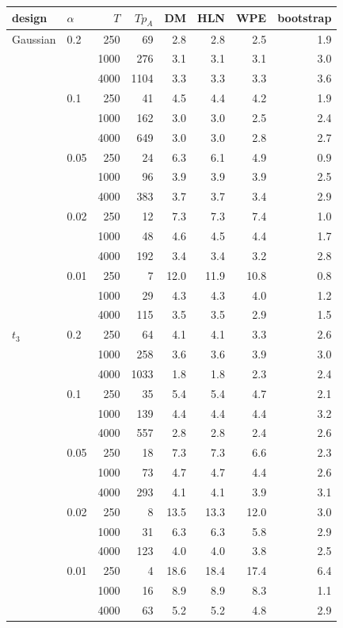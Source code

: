 \begin{tabular}{llrrrrrr}
\toprule
design & $\alpha$ & $T$ & $Tp_A$ & DM & HLN & WPE & bootstrap\\
\midrule
Gaussian & 0.2 & 250 & 69 & 2.8 & 2.8 & 2.5 & 1.9\\
 &  & 1000 & 276 & 3.1 & 3.1 & 3.1 & 3.0\\
 &  & 4000 & 1104 & 3.3 & 3.3 & 3.3 & 3.6\\
 & 0.1 & 250 & 41 & 4.5 & 4.4 & 4.2 & 1.9\\
 &  & 1000 & 162 & 3.0 & 3.0 & 2.5 & 2.4\\
 &  & 4000 & 649 & 3.0 & 3.0 & 2.8 & 2.7\\
 & 0.05 & 250 & 24 & 6.3 & 6.1 & 4.9 & 0.9\\
 &  & 1000 & 96 & 3.9 & 3.9 & 3.9 & 2.5\\
 &  & 4000 & 383 & 3.7 & 3.7 & 3.4 & 2.9\\
 & 0.02 & 250 & 12 & 7.3 & 7.3 & 7.4 & 1.0\\
 &  & 1000 & 48 & 4.6 & 4.5 & 4.4 & 1.7\\
 &  & 4000 & 192 & 3.4 & 3.4 & 3.2 & 2.8\\
 & 0.01 & 250 & 7 & 12.0 & 11.9 & 10.8 & 0.8\\
 &  & 1000 & 29 & 4.3 & 4.3 & 4.0 & 1.2\\
 &  & 4000 & 115 & 3.5 & 3.5 & 2.9 & 1.5\\
\midrule
$t_3$ & 0.2 & 250 & 64 & 4.1 & 4.1 & 3.3 & 2.6\\
 &  & 1000 & 258 & 3.6 & 3.6 & 3.9 & 3.0\\
 &  & 4000 & 1033 & 1.8 & 1.8 & 2.3 & 2.4\\
 & 0.1 & 250 & 35 & 5.4 & 5.4 & 4.7 & 2.1\\
 &  & 1000 & 139 & 4.4 & 4.4 & 4.4 & 3.2\\
 &  & 4000 & 557 & 2.8 & 2.8 & 2.4 & 2.6\\
 & 0.05 & 250 & 18 & 7.3 & 7.3 & 6.6 & 2.3\\
 &  & 1000 & 73 & 4.7 & 4.7 & 4.4 & 2.6\\
 &  & 4000 & 293 & 4.1 & 4.1 & 3.9 & 3.1\\
 & 0.02 & 250 & 8 & 13.5 & 13.3 & 12.0 & 3.0\\
 &  & 1000 & 31 & 6.3 & 6.3 & 5.8 & 2.9\\
 &  & 4000 & 123 & 4.0 & 4.0 & 3.8 & 2.5\\
 & 0.01 & 250 & 4 & 18.6 & 18.4 & 17.4 & 6.4\\
 &  & 1000 & 16 & 8.9 & 8.9 & 8.3 & 1.1\\
 &  & 4000 & 63 & 5.2 & 5.2 & 4.8 & 2.9\\
\bottomrule
\end{tabular}
